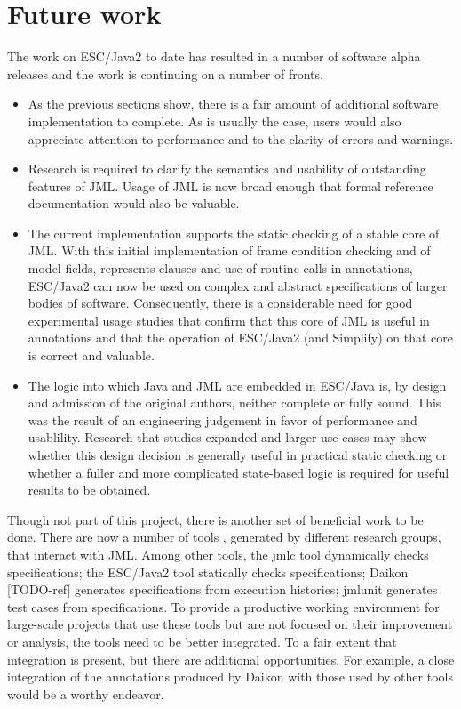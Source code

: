 \documentclass{acm_proc_article-sp}
\begin{document}
\section{Future work}
The work on ESC/Java2 to date has resulted in a number of software alpha releases
and the work is continuing on a number of fronts.
\begin{itemize}
\item As the previous sections show, there is a fair amount of additional software 
implementation to complete.  As is usually the case, users would 
also appreciate attention
to performance and to the clarity of errors and warnings.
\item Research is required to clarify the semantics and usability of
outstanding features of JML.  Usage of JML is now broad enough that formal 
reference documentation would also be valuable.
\item The current implementation supports the static checking of
a stable core of JML.  With this initial implementation of frame condition checking
and of model fields, represents clauses and use of routine calls in 
annotations, ESC/Java2 can now be used on complex and abstract specifications of
larger bodies of software.
Consequently, there is a considerable need for good experimental usage studies
that confirm
that this core of JML is useful in annotations
and that the operation of ESC/Java2 (and Simplify) on that core is correct and valuable.
\item The logic into which Java and JML are embedded in ESC/Java is, by design and
admission of the original authors, neither complete or fully sound.  This was the 
result of an
engineering judgement in favor of performance and usablility.  Research that studies
expanded and larger use cases may show whether this design decision 
is generally useful in
practical static checking or whether a fuller and more complicated state-based logic
is required for useful results to be obtained.
\end{itemize}

Though not part of this project, there is another set of beneficial work to be done.
There are now a number of tools \cite{Burdy-etal03}, generated by different research groups, 
that interact
with JML.  Among other tools, the jmlc\cite{Cheon-Leavens02b}
tool dynamically checks specifications; the ESC/Java2 tool statically
checks specifications; Daikon [TODO-ref] generates specifications from execution
histories; jmlunit \cite{Cheon-Leavens02} generates test cases from specifications.
To provide a productive working environment for large-scale projects that use these
tools but are not focused on their improvement or analysis, the tools need to be
better integrated.  To a fair extent that integration is present, but there are
additional opportunities.  For example, a close integration of the annotations
produced by Daikon with those used by other tools would be a worthy endeavor.   
\end{document}
